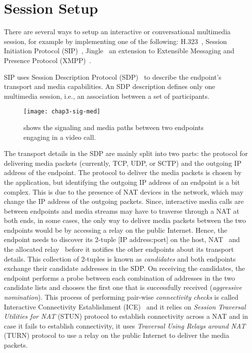 \section{Session Setup}


There are several ways to setup an interactive or conversational multimedia
session, for example by implementing one of the following:
H.323~\cite{H.323}, Session Initiation Protocol (SIP)~\cite{rfc3261},
Jingle~\cite{XEP-0166} an extension to Extensible Messaging and Presence
Protocol (XMPP)~\cite{rfc6120}. 

SIP uses Session Description Protocol (SDP)~\cite{rfc4566} to describe the
endpoint's transport and media capabilities. An SDP description defines only
one multimedia session, i.e., an association between a set of participants.

\begin{figure}[!h]
\centerline{\texttt{[image: chap3-sig-med]}}
\caption{shows the signaling and media paths between two endpoints engaging in
a video call.}
\label{fig:3:sig.media}
\end{figure}


The transport details in the SDP are mainly split into two parts: the protocol
for delivering media packets (currently, TCP, UDP, or SCTP) and the outgoing
IP address of the endpoint. The protocol to deliver the media packets is
chosen by the application, but identifying the outgoing IP address of an
endpoint is a bit complex. This is due to the presence of NAT devices in the
network, which may change the IP address of the outgoing packets. Since,
interactive media calls are between endpoints and media streams may have to
traverse through a NAT at both ends, in some cases, the only way to deliver
media packets between the two endpoints would be by accessing a relay on the
public Internet. Hence, the endpoint needs to discover its 2-tuple [IP
address:port] on the host, NAT~\cite{rfc5389} and the allocated
relay~\cite{rfc5766} before it notifies the other endpoints about its
transport details. This collection of 2-tuples is known as \emph{candidates}
and both endpoints exchange their candidate addresses in the SDP. On receiving
the candidates, the endpoint performs a probe between each combination of
addresses in the two candidate lists and chooses the first one that is
successfully received (\emph{aggressive nomination}). This process of
performing pair-wise \emph{connectivity checks} is called Interactive
Connectivity Establishment (ICE)~\cite{rfc5245, rfc6544} and it relies on
\emph{Session Traversal Utilities for NAT} (STUN) protocol to establish
connectivity across a NAT and in case it fails to establish connectivity, it
uses \emph{Traversal Using Relays around NAT} (TURN) protocol to use a relay
on the public Internet to deliver the media packets.

